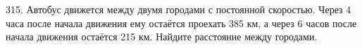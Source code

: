 315. Автобус движется между двумя городами с постоянной скоростью. Через 4 часа после начала движения ему остаётся проехать 385 км, а через 6 часов после начала движения остаётся 215 км. Найдите расстояние между городами.\\

